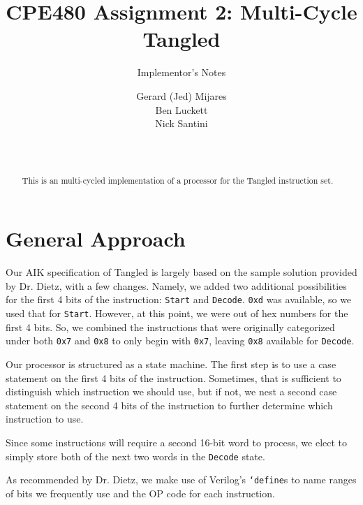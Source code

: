 \documentclass{sig-alternate-05-2015}
\begin{document}

\title{CPE480 Assignment 2: Multi-Cycle Tangled }
\subtitle{Implementor's Notes}

\author{
Gerard (Jed) Mijares\\
Ben Luckett\\
Nick Santini\\
       \\
       \\
}

\maketitle
\begin{abstract}
This is an multi-cycled implementation of a processor for the Tangled instruction set.
\end{abstract}

\section{General Approach}

Our AIK specification of Tangled is largely based on the sample solution provided by Dr. Dietz, with a few changes. Namely, we added two additional possibilities for the first 4 bits of the instruction: \texttt{Start} and \texttt{Decode}. \texttt{0xd} was available, so we used that for \texttt{Start}. However, at this point, we were out of hex numbers for the first 4 bits. So, we combined the instructions that were originally categorized under both \texttt{0x7} and \texttt{0x8} to only begin with \texttt{0x7}, leaving \texttt{0x8} available for \texttt{Decode}.

Our processor is structured as a state machine. The first step is to use a case statement on the first 4 bits of the instruction. Sometimes, that is sufficient to distinguish which instruction we should use, but if not, we nest a second case statement on the second 4 bits of the instruction to further determine which instruction to use.

Since some instructions will require a second 16-bit word to process, we elect to simply store both of the next two words in the \texttt{Decode} state.

As recommended by Dr. Dietz, we make use of Verilog's \texttt{`define}s to name ranges of bits we frequently use and the OP code for each instruction.
\end{document}
